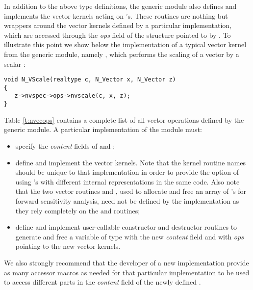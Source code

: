 In addition to the above type definitions, the generic {\nvector} module
also defines and implements the vector kernels acting on 's.
These routines are nothing but wrappers around the vector kernels defined by
a particular {\nvector} implementation, which are accessed through the {\em ops}
field of the structure pointed to by . To illustrate this point we
show below the implementation of a typical vector kernel from the
generic {\nvector} module, namely , which performs the scaling of a
vector  by a scalar :
\begin{verbatim}
void N_VScale(realtype c, N_Vector x, N_Vector z) 
{
   z->nvspec->ops->nvscale(c, x, z);
}
\end{verbatim}
Table \ref{t:nvecops} contains a complete list of all vector operations defined
by the generic {\nvector} module.
A particular implementation of the {\nvector} module must:
\begin{itemize}
\item specify the {\em content} fields of  and ;
\item define and implement the vector kernels. Note that the kernel routine 
  names should be unique to that implementation in order 
  to provide the option of using 's with different 
  internal representations in the same code. Also note that the two
  vector routines  and , used to allocate and
  free an array of 's for forward sensitivity analysis, need not
  be defined by the {\nvector} implementation as they rely completely
  on the  and  routines;
\item define and implement user-callable constructor and destructor
  routines to generate and free a variable of type  with
  the new {\em content} field and with {\em ops} pointing to the
  new vector kernels.
\end{itemize}
We also strongly recommend that the developer of a new 
{\nvector} implementation provide as many accessor macros 
as needed for that particular implementation to 
be used to access different parts in the {\em content} field
of the newly defined .



\bigskip
\newlength{\colone}
\newlength{\coltwo}
\setlength{\coltwo}{\textwidth}
\addtolength{\coltwo}{-0.5in}
\addtolength{\coltwo}{-\colone}

